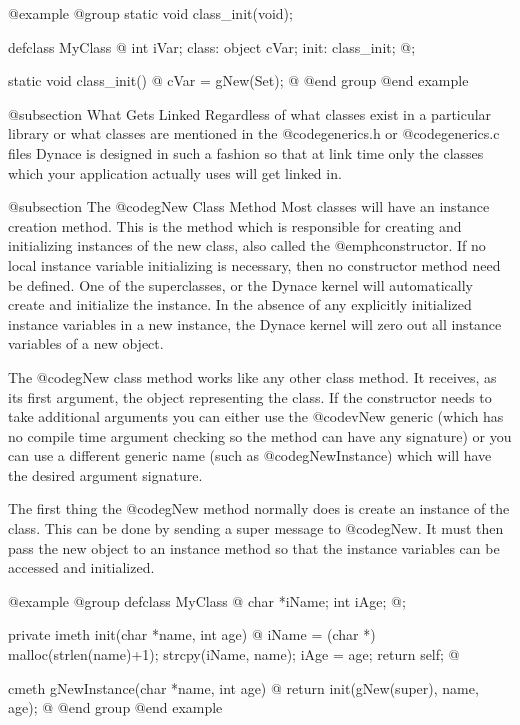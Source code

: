 @example
@group
static  void    class_init(void);

defclass  MyClass  @{
        int     iVar;
 class:
        object  cVar;
 init:  class_init;
@};

static  void    class_init()
@{
        cVar = gNew(Set);
@}
@end group
@end example


@subsection What Gets Linked
Regardless of what classes exist in a particular library or what
classes are mentioned in the @code{generics.h} or @code{generics.c}
files Dynace is designed in such a fashion so that at link time
only the classes which your application actually uses will get linked
in.


@subsection The @code{gNew} Class Method
Most classes will have an instance creation method.  This is the method
which is responsible for creating and initializing instances of the new
class, also called the @emph{constructor}.  If no local instance
variable initializing is necessary, then no constructor method need be
defined.  One of the superclasses, or the Dynace kernel will automatically
create and initialize the instance.  In the absence of any explicitly
initialized instance variables in a new instance, the Dynace kernel will
zero out all instance variables of a new object.

The @code{gNew} class method works like any other class method.  It
receives, as its first argument, the object representing the class.
If the constructor needs to take additional arguments you can either
use the @code{vNew} generic (which has no compile time argument checking
so the method can have any signature) or you can use a different generic name
(such as @code{gNewInstance}) which will have the desired argument
signature.

The first thing the @code{gNew} method normally does is create an
instance of the class.  This can be done by sending a super message to
@code{gNew}.  It must then pass the new object to an instance method
so that the instance variables can be accessed and initialized.

@example
@group
defclass  MyClass  @{
        char    *iName;
        int     iAge;
@};

private imeth  init(char *name, int age)
@{
        iName = (char *) malloc(strlen(name)+1);
        strcpy(iName, name);
        iAge = age;
        return self;
@}

cmeth  gNewInstance(char *name, int age)
@{
        return init(gNew(super), name, age);
@}
@end group
@end example

